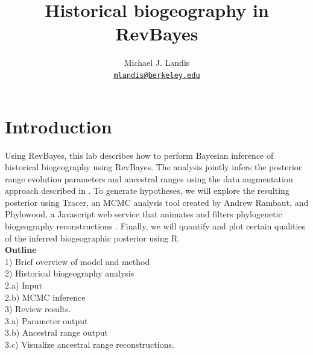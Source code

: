 \documentclass[11pt]{article}
\begin{document}


\title{Historical biogeography in RevBayes}
\author{Michael J. Landis \\ \href{mailto:mlandis@berkeley.edu}{\texttt{mlandis@berkeley.edu}}}
\maketitle

\section{Introduction}

Using RevBayes, this lab describes how to perform Bayesian inference of historical biogeography using RevBayes. The analysis jointly infers the posterior range evolution parameters and ancestral ranges using the data augmentation approach described in \citet{landis13}.
To generate hypotheses, we will explore the resulting posterior using Tracer, an MCMC analysis tool created by Andrew Rambaut, and Phylowood, a Javascript web service that animates and filters phylogenetic biogeography reconstructions \citep{landis14}.
Finally, we will quantify and plot certain qualities of the inferred biogeographic posterior using R. \\


\noindent \textbf{Outline} \\
1) Brief overview of model and method \\
2) Historical biogeography analysis \\
2.a) Input \\
2.b) MCMC inference \\
3) Review results. \\
3.a) Parameter output \\
3.b) Ancestral range output \\
3.c) Visualize ancestral range reconstructions. \\

\end{document}
